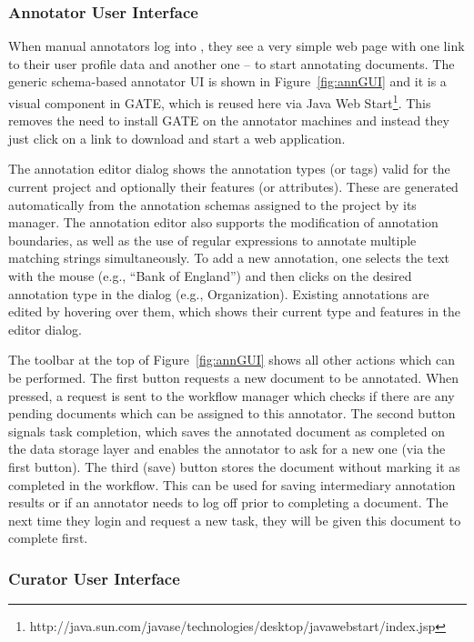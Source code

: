 \subsubsection{Annotator User Interface}

When manual annotators log into \teamware, they see a very simple web page with one link to their user profile data and another one -- to start annotating documents. The generic schema-based annotator UI is shown in Figure~\ref{fig:annGUI} and it is a visual component in GATE, which is reused here via Java Web Start\footnote{http://java.sun.com/javase/technologies/desktop/javawebstart/index.jsp}. This removes the need to install GATE on the annotator machines and instead they just click on a link to download and start a web application. 

The annotation editor dialog shows the annotation types (or tags) valid for the current project and optionally their features (or attributes). These are generated automatically from the annotation schemas assigned to the project by its manager. The annotation editor also supports the modification of annotation boundaries, as well as the use of regular expressions to annotate multiple matching strings simultaneously. To add a new annotation, one selects the text with the mouse (e.g., ``Bank of England'') and then clicks on the desired annotation type in the dialog (e.g., Organization). Existing annotations are edited by hovering over them, which shows their current type and features in the editor dialog. 

The toolbar at the top of Figure~\ref{fig:annGUI} shows all other actions which can be performed. The first button requests a new document to be annotated. When pressed, a request is sent to the workflow manager which checks if there are any pending documents which can be assigned to this annotator. The second button signals task completion, which saves the annotated document as completed on the data storage layer and enables the annotator to ask for a new one (via the first button). The third (save) button stores the document without marking it as completed in the workflow. This can be used for saving intermediary annotation results or if an annotator needs to log off prior to completing a document. The next time they login and request a new task, they will be given this document to complete first.   

\subsubsection{Curator User Interface}

